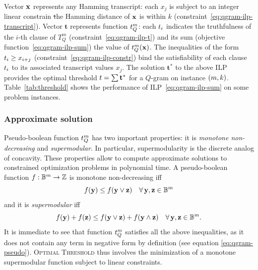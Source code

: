 Vector $\mathbf{x}$ represents any Hamming transcript: each $x_j$ is subject to an integer linear constrain \st the Hamming distance of $\mathbf{x}$ is within $k$ (constraint~\ref{eq:qgram-ilp-transcript}).
Vector $\mathbf{t}$ represents function $t_{Q}^{m}$: each $t_i$ indicates the truthfulness of the $i$-th clause of $T_{Q}^{m}$ (constraint~\ref{eq:qgram-ilp-t}) and its sum (objective function~\ref{eq:qgram-ilp-sum}) the value of $t_{Q}^{m}(\mathbf{x})$.
The inequalities of the form $t_i \geq x_{i+j}$ (constraint~\ref{eq:qgram-ilp-constr}) bind the satisfiability of each clause $t_i$ to its associated transcript values $x_j$.
The solution $\mathbf{t}^*$ to the above ILP provides the optimal threshold $t=\sum \mathbf{t}^*$ for a $Q$-gram on instance $(m,k)$.
Table~\ref{tab:threshold} shows the performance of ILP~\ref{eq:qgram-ilp-sum} on some problem instances.

\subsubsection{Approximate solution}

Pseudo-boolean function $t_{Q}^{m}$ has two important properties: it is \emph{monotone non-decreasing} and \emph{supermodular}.
In particular, supermodularity is the discrete analog of concavity.
These properties allow to compute approximate solutions to constrained optimization problems in polynomial time.
A pseudo-boolean function $f : \mathbb{B}^{m} \rightarrow \mathbb{Z}$ is monotone non-decreasing iff 
\begin{equation}
\label{eq:monotone-non-decreasing}
f(\mathbf{y}) \leq f(\mathbf{y} \vee \mathbf{z}) \quad \forall \, \mathbf{y}, \mathbf{z} \in \mathbb{B}^{m}
\end{equation}
and it is \emph{supermodular} iff 
\begin{equation}
\label{eq:supermodularity}
f(\mathbf{y}) + f(\mathbf{z}) \leq f(\mathbf{y} \vee \mathbf{z}) + f(\mathbf{y} \wedge \mathbf{z}) \quad \forall \, \mathbf{y}, \mathbf{z} \in \mathbb{B}^{m}.
\end{equation}
It is immediate to see that function $t_{Q}^{m}$ satisfies all the above inequalities, as it does not contain any term in negative form by definition (see equation \ref{eq:qgram-pseudo}).
\textsc{Optimal Threshold} thus involves the minimization of a monotone supermodular function subject to linear constraints.

